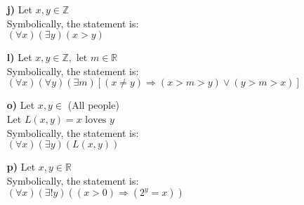 \documentclass[12pt,letterpaper]{article}
\begin{document}
\begin{enumerate}[label= \textbf{\alph*)}]
	\item[\textbf{j)}] Let $x, y \in \mathbb{Z}$\\
						Symbolically, the statement is:\\
						$(\forall x)(\exists y)(x > y)$ 
	\item[\textbf{l)}] Let $x, y \in \mathbb{Z}, \text{ let } m \in \mathbb{R}$\\
						Symbolically, the statement is:\\
						$(\forall x)(\forall y)(\exists m)[(x \neq y) \Rightarrow (x > m > y) \lor (y > m > x)]$ 
	\item[\textbf{o)}] Let $x, y \in$ (All people)\\
						Let $L(x, y) = x \text{ loves } y$\\
						Symbolically, the statement is:\\
						$(\forall x)(\exists y) (L(x,y))$
	\item[\textbf{p)}] Let $x, y \in \mathbb{R}$\\
						Symbolically, the statement is:\\
						$(\forall x)(\exists! y)((x > 0) \Rightarrow (2^y=x))$ 
\end{enumerate}
\end{document}
